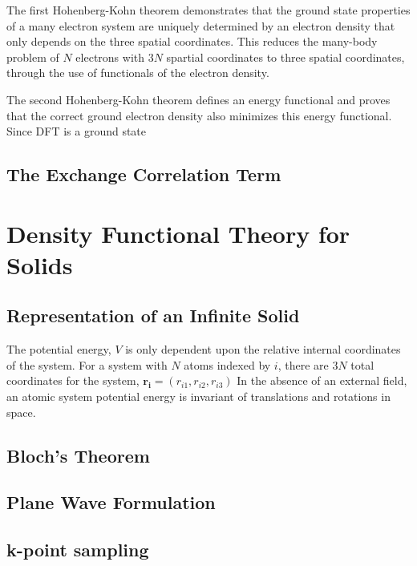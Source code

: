 The first Hohenberg-Kohn theorem demonstrates that the ground state properties of a many electron system are uniquely determined by an electron density that only depends on the three spatial coordinates.  This reduces the many-body problem of $N$ electrons with $3N$ spartial coordinates to three spatial coordinates, through the use of functionals of the electron density.

The second Hohenberg-Kohn theorem defines an energy functional and proves that the correct ground electron density also minimizes this energy functional.  Since DFT is a ground state
\subsection{The Exchange Correlation Term}
\section{Density Functional Theory for Solids}
\subsection{Representation of an Infinite Solid}

The potential energy, $V$ is only dependent upon the relative internal coordinates of the system.
For a system with $N$ atoms indexed by $i$, there are $3N$ total coordinates for the system,
	$\bm{r_{i}}=(r_{i1},r_{i2},r_{i3})$
In the absence of an external field, an atomic system potential energy is invariant of translations and rotations in space.

\subsection{Bloch's Theorem}
\subsection{Plane Wave Formulation}
\subsection{k-point sampling}
